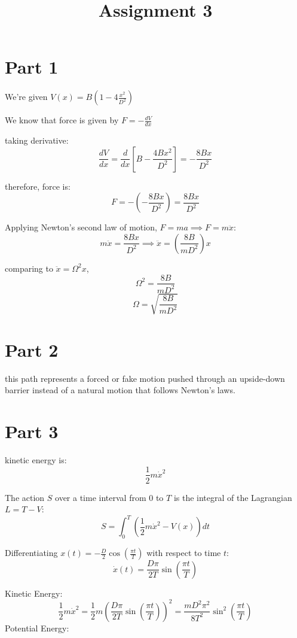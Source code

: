 \documentclass{article}
\title{Assignment 3}
\begin{document}
\setlength{\parindent}{0pt}
\maketitle

\section{Part 1}

We're given $V(x) = B\left(1 - 4\frac{x^2}{D^2}\right)$

We know that force is given by $F = -\frac{dV}{dx}$

taking derivative:
\[
\frac{dV}{dx} = \frac{d}{dx} \left[ B - \frac{4Bx^2}{D^2} \right] = -\frac{8Bx}{D^2}
\]

therefore, force is:
\[
F = - \left(-\frac{8Bx}{D^2}\right) = \frac{8Bx}{D^2}
\]

Applying Newton's second law of motion, $F=ma \implies F=m\ddot{x}$:
\[
m\ddot{x} = \frac{8Bx}{D^2} \implies \ddot{x} = \left(\frac{8B}{mD^2}\right)x
\]

comparing to $\ddot{x} = \Omega^2 x$,
\[
\Omega^2 = \frac{8B}{mD^2}
\]
\[
\Omega = \sqrt{\frac{8B}{mD^2}}
\]

\section{Part 2}

this path represents a forced or fake motion pushed through an upside-down barrier instead of a natural motion that follows Newton's laws.

\section{Part 3}

kinetic energy is:
\[
\frac{1}{2}m\dot{x}^2
\]

The action $S$ over a time interval from $0$ to $T$ is the integral of the Lagrangian $L = T - V$:
\[
S = \int_{0}^{T} \left( \frac{1}{2}m\dot{x}^2 - V(x) \right) dt
\]

Differentiating $x(t) = -\frac{D}{2}\cos\left(\frac{\pi t}{T}\right)$ with respect to time $t$:
\[
\dot{x}(t) = \frac{D\pi}{2T} \sin\left(\frac{\pi t}{T}\right)
\]

Kinetic Energy:
\[
\frac{1}{2}m\dot{x}^2 = \frac{1}{2}m \left( \frac{D\pi}{2T} \sin\left(\frac{\pi t}{T}\right) \right)^2 = \frac{m D^2 \pi^2}{8 T^2} \sin^2\left(\frac{\pi t}{T}\right)
\]
Potential Energy:
\end{document}
